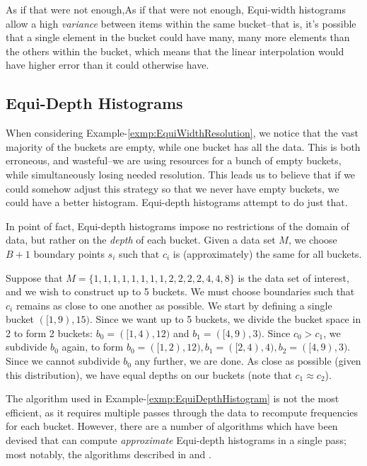 As if that were not enough,As if that were not enough,  Equi-width histograms allow a high \emph{variance} between items within the same bucket--that is, it's possible that a single element in the bucket could have many, many more elements than the others within the bucket, which means that the linear interpolation would have higher error than it could otherwise have.

\subsection{Equi-Depth Histograms}
\label{sec:EquiDepth}
When considering Example-\ref{exmp:EquiWidthResolution}, we notice that the vast majority of the buckets are empty, while one bucket has all the data. This is both erroneous, and wasteful--we are using resources for a bunch of empty buckets, while simultaneously losing needed resolution. This leads us to believe that if we could somehow adjust this strategy so that we never have empty buckets, we could have a better histogram. Equi-depth histograms attempt to do just that.

In point of fact, Equi-depth histograms impose no restrictions of the domain of data, but rather on the \emph{depth} of each bucket. Given a data set $M$, we choose $B+1$ boundary points $s_i$ such that $c_i$ is (approximately) the same for all buckets.

\begin{exmp}
				\label{exmp:EquiDepthHistogram}
Suppose that $M =\lbrace 1,1,1,1,1,1,1,1,2,2,2,2,4,4,8\rbrace$ is the data set of interest, and we wish to construct up to 5 buckets. We must choose boundaries such that $c_i$ remains as close to one another as possible. We start by defining a single bucket $([1,9),15)$. Since we want up to 5 buckets, we divide the bucket space in 2 to form 2 buckets: $b_0 = ([1,4),12)$ and $b_1 = ([4,9),3)$. Since $c_0 > c_1$, we subdivide $b_0$ again, to form $b_0 = ([1,2),12),b_1 = ([2,4),4),b_2=([4,9),3)$. Since we cannot subdivide $b_0$ any further, we are done. As close as possible (given this distribution), we have equal depths on our buckets (note that $c_1 \approx c_2$).
\end{exmp}

The algorithm used in Example-\ref{exmp:EquiDepthHistogram} is not the most efficient, as it requires multiple passes through the data to recompute frequencies for each bucket. However, there are a number of algorithms which have been devised that can compute \emph{approximate} Equi-depth histograms in a single pass; most notably, the algorithms described in \cite{MousaviEquiDepthDataStreams} and \cite{GibbonsFastIncremental}.

